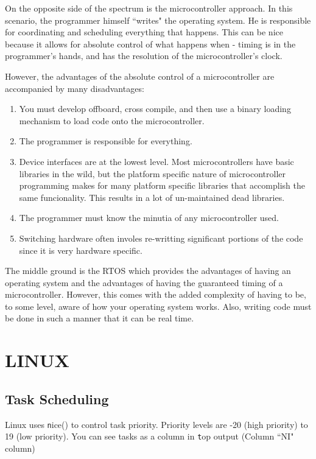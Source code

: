 \documentclass{article}
\begin{document}
On the opposite side of the spectrum is the microcontroller approach.  In this scenario, the programmer himself ``writes" the operating system.  He is responsible for coordinating and scheduling everything that happens.  This can be nice because it allows for absolute control of what happens when - timing is in the programmer's hands, and has the resolution of the microcontroller's clock.

However, the advantages of the absolute control of a microcontroller are accompanied by many disadvantages:
\begin{enumerate}
\item You must develop offboard, cross compile, and then use a binary loading mechanism to load code onto the microcontroller.
\item The programmer is responsible for everything.
\item Device interfaces are at the lowest level.  Most microcontrollers have basic libraries in the wild, but the platform specific nature of microcontroller programming makes for many platform specific libraries that accomplish the same funcionality.  This results in a lot of un-maintained dead libraries.
\item The programmer must know the minutia of any microcontroller used.
\item Switching hardware often involes re-writting significant portions of the code since it is very hardware specific.
\end{enumerate}

The middle ground is the RTOS which provides the advantages of having an operating system and the advantages of having the guaranteed timing of a microcontroller.  However, this comes with the added complexity of having to be, to some level, aware of how your operating system works.  Also, writing code must be done in such a manner that it can be real time.

\section{LINUX}
\subsection{Task Scheduling}
Linux uses {\texttt nice()} to control task priority.  Priority levels are -20 (high priority) to 19 (low priority).  You can see tasks as a column in {\texttt top} output (Column ``NI" column)
\end{document}
